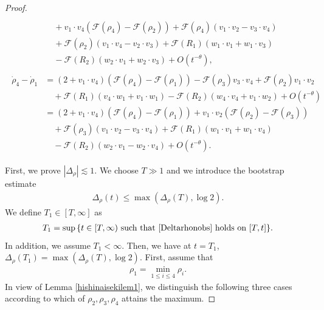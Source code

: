 \documentclass[reqno]{amsart}
\theoremstyle{plain}
\theoremstyle{definition}
\numberwithin{equation}{section}
\begin{document}
\begin{proof}
\begin{align}
\begin{aligned}
\\
&\quad+v_1\cdot v_4\left(\mathcal{F}(\rho_4)-\mathcal{F}(\rho_2)\right)+\mathcal{F}(\rho_4)\left(v_1\cdot v_2-v_3\cdot v_4\right)
\\
&\quad+\mathcal{F}(\rho_2)\left(v_1\cdot v_4-v_2\cdot v_3\right)+\mathcal{F}(R_1)\left(w_1\cdot v_1+w_1\cdot v_3\right)
\\
&\quad-\mathcal{F}(R_2)\left(w_2\cdot v_1+w_2\cdot v_3\right)+O\left(t^{-\theta}\right),
\end{aligned}
\end{align}
\begin{align}\label{rho4-rho1es1}
\begin{aligned}
\dot{\rho}_4-\dot{\rho}_1&=\left(2+v_1\cdot v_4\right)\left(\mathcal{F}(\rho_4)-\mathcal{F}(\rho_1)\right)-\mathcal{F}(\rho_3)v_3\cdot v_4+\mathcal{F}(\rho_2)v_1\cdot v_2
\\
&\quad+\mathcal{F}(R_1)\left(v_4\cdot w_1+v_1\cdot w_1\right)-\mathcal{F}(R_2)\left(w_4\cdot v_4+v_1\cdot w_2\right)+O\left(t^{-\theta}\right)
\\
&=\left(2+v_1\cdot v_4\right)\left(\mathcal{F}(\rho_4)-\mathcal{F}(\rho_1)\right)+v_1\cdot v_2\left(\mathcal{F}(\rho_2)-\mathcal{F}(\rho_3)\right)
\\
&\quad+\mathcal{F}(\rho_3)\left(v_1\cdot v_2-v_3\cdot v_4\right)+\mathcal{F}(R_1)\left(w_1\cdot v_1+w_1\cdot v_4\right)
\\
&\quad-\mathcal{F}(R_2)\left(w_2\cdot v_1-w_2\cdot v_4\right)+O\left(t^{-\theta}\right).
\end{aligned}
\end{align}



First, we prove $|\Delta_{\rho}|\lesssim 1$. We choose $T\gg 1$ and we introduce the bootstrap estimate 
\begin{align}\label{Deltarhonobs}
\Delta_{\rho}(t)\leq \max{(\Delta_{\rho}(T),\log{2})}.
\end{align}
We define $T_1\in [T,\infty]$ as 
\begin{align}\label{rho-Lyuukaibs2}
T_1=\sup{\{t\in[T,\infty)\ \mbox{such that}\ \eqref{Deltarhonobs}\ \mbox{holds on}\ [T,t] \}}.
\end{align}
In addition, we assume $T_1<\infty$. Then, we have at $t=T_1$, $\Delta_{\rho}(T_1)=\max{(\Delta_{\rho}(T),\log{2})}$. First, assume that
\begin{align*}
\rho_1=\min_{1\leq i\leq4}\rho_i.
\end{align*}
In view of Lemma \ref{hishinaisekilem1}, we distinguish the following three cases according to which of $\rho_2,\rho_3,\rho_4$ attains the maximum.


\end{proof}
\end{document}
